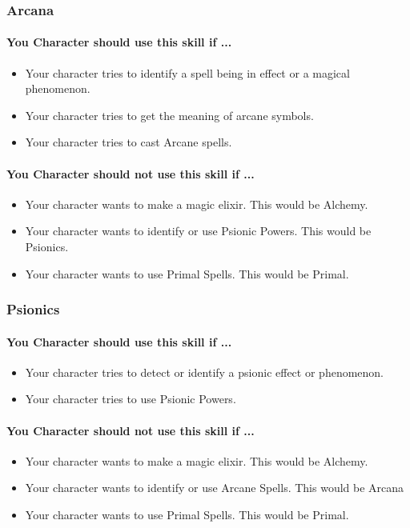 \begin{multicols}{2}
\subsubsection{Arcana}\label{skill:arcana}
\paragraph{You Character should use this skill if ...}
\begin{itemize}
    \item Your character tries to identify a spell being in effect or a magical
        phenomenon.
    \item Your character tries to get the meaning of arcane symbols.
    \item Your character tries to cast Arcane spells.
\end{itemize}
\paragraph{You Character should not use this skill if ...}
\begin{itemize}
    \item Your character wants to make a magic elixir.  This would be Alchemy.
    \item Your character wants to identify or use Psionic Powers. This would be
        Psionics.
    \item Your character wants to use Primal Spells. This would be Primal.
\end{itemize}

\subsubsection{Psionics}\label{skill:psionics}
\paragraph{You Character should use this skill if ...}
\begin{itemize}
    \item Your character tries to detect or identify a psionic effect or
        phenomenon.
    \item Your character tries to use Psionic Powers.
\end{itemize}
\paragraph{You Character should not use this skill if ...}
\begin{itemize}
    \item Your character wants to make a magic elixir.  This would be Alchemy.
    \item Your character wants to identify or use Arcane Spells. This would
        be Arcana
    \item Your character wants to use Primal Spells. This would be Primal.
\end{itemize}


\end{multicols}
